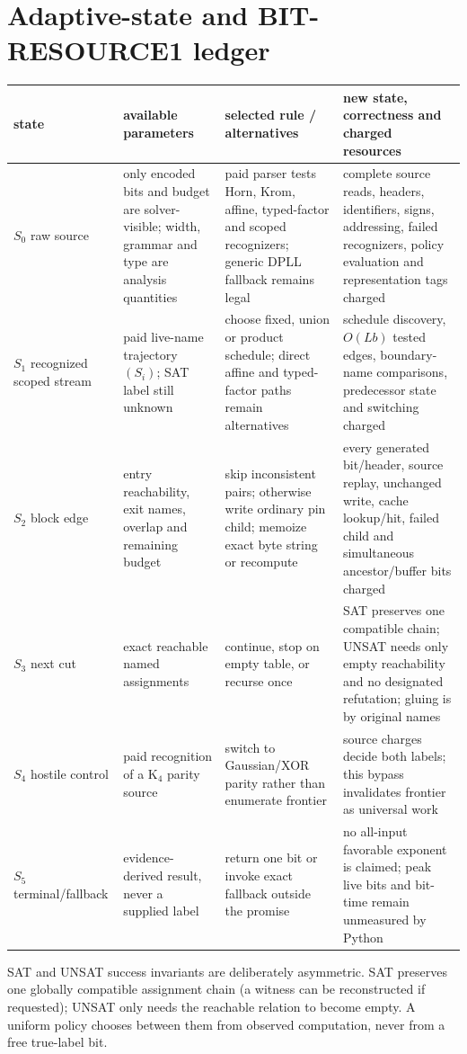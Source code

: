 \documentclass[11pt]{article}
\begin{document}
\section{Adaptive-state and BIT-RESOURCE1 ledger}
\begin{longtable}{p{.13\linewidth}p{.19\linewidth}p{.23\linewidth}p{.34\linewidth}}
\toprule
state & available parameters & selected rule / alternatives & new state, correctness and charged resources\\\midrule
$S_0$ raw source & only encoded bits and budget are solver-visible; width, grammar and type are analysis quantities & paid parser tests Horn, Krom, affine, typed-factor and scoped recognizers; generic DPLL fallback remains legal & complete source reads, headers, identifiers, signs, addressing, failed recognizers, policy evaluation and representation tags charged\\
$S_1$ recognized scoped stream & paid live-name trajectory $(S_i)$; SAT label still unknown & choose fixed, union or product schedule; direct affine and typed-factor paths remain alternatives & schedule discovery, $O(Lb)$ tested edges, boundary-name comparisons, predecessor state and switching charged\\
$S_2$ block edge & entry reachability, exit names, overlap and remaining budget & skip inconsistent pairs; otherwise write ordinary pin child; memoize exact byte string or recompute & every generated bit/header, source replay, unchanged write, cache lookup/hit, failed child and simultaneous ancestor/buffer bits charged\\
$S_3$ next cut & exact reachable named assignments & continue, stop on empty table, or recurse once & SAT preserves one compatible chain; UNSAT needs only empty reachability and no designated refutation; gluing is by original names\\
$S_4$ hostile control & paid recognition of a K$_4$ parity source & switch to Gaussian/XOR parity rather than enumerate frontier & source charges decide both labels; this bypass invalidates frontier as universal work\\
$S_5$ terminal/fallback & evidence-derived result, never a supplied label & return one bit or invoke exact fallback outside the promise & no all-input favorable exponent is claimed; peak live bits and bit-time remain unmeasured by Python\\
\bottomrule
\end{longtable}

SAT and UNSAT success invariants are deliberately asymmetric.  SAT preserves
one globally compatible assignment chain (a witness can be reconstructed if
requested); UNSAT only needs the reachable relation to become empty.  A
uniform policy chooses between them from observed computation, never from a
free true-label bit.
\end{document}
